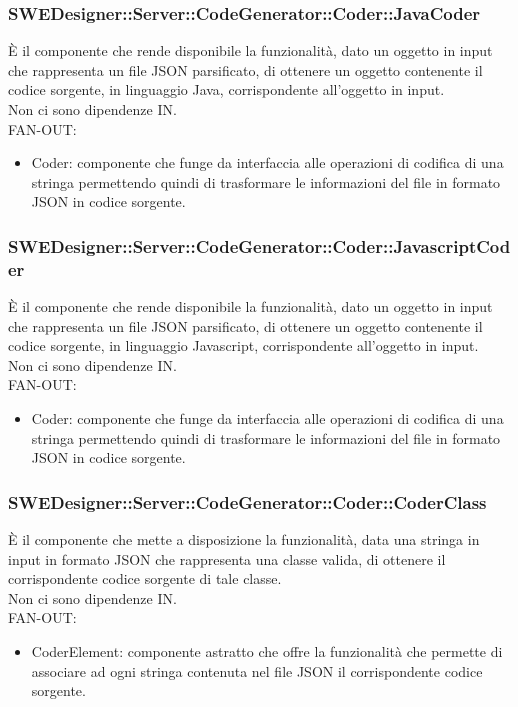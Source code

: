 \documentclass[../PianoDiQualifica.tex]{subfiles}
\begin{document}
		\subsubsection{SWEDesigner::Server::CodeGenerator::Coder::JavaCoder}
		È il componente che rende disponibile la funzionalità, dato un oggetto in input che rappresenta un file JSON parsificato, di ottenere un oggetto contenente il codice sorgente, in linguaggio Java, corrispondente all'oggetto in input.\\
		Non ci sono dipendenze IN.\\
			FAN-OUT:
			\begin{itemize}
				\item Coder: componente che funge da interfaccia alle operazioni di codifica di una stringa permettendo quindi di trasformare le informazioni del file in formato JSON in codice sorgente.
			\end{itemize}
		\subsubsection{SWEDesigner::Server::CodeGenerator::Coder::JavascriptCoder}
		È il componente che rende disponibile la funzionalità, dato un oggetto in input che rappresenta un file JSON parsificato, di ottenere un oggetto contenente il codice sorgente, in linguaggio Javascript, corrispondente all'oggetto in input.\\
		Non ci sono dipendenze IN.\\
		FAN-OUT:
		\begin{itemize}
			\item Coder: componente che funge da interfaccia alle operazioni di codifica di una stringa permettendo quindi di trasformare le informazioni del file in formato JSON in codice sorgente.
		\end{itemize}
		\subsubsection{SWEDesigner::Server::CodeGenerator::Coder::CoderClass}
		È il componente che mette a disposizione la funzionalità, data una stringa in input in formato JSON che rappresenta una classe valida, di ottenere il corrispondente codice sorgente di tale classe.\\
		Non ci sono dipendenze IN.\\
	FAN-OUT:
	\begin{itemize}
		\item CoderElement: componente astratto che offre la funzionalità che permette di associare ad ogni stringa contenuta nel file JSON il corrispondente codice sorgente.
	\end{itemize}
\end{document}
